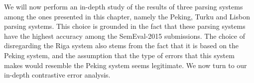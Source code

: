 We will now perform an in-depth study of the results of three parsing systems among the ones presented in this chapter, namely the Peking, Turku and Lisbon parsing systems. This choice is grounded in the fact that these parsing systems have the highest accuracy among the SemEval-2015 submissions. The choice of disregarding the Riga system also stems from the fact that it is based on the Peking system, and the assumption that the type of errors that this system makes would resemble the Peking system seems legitimate. We now turn to our in-depth contrastive error analysis.